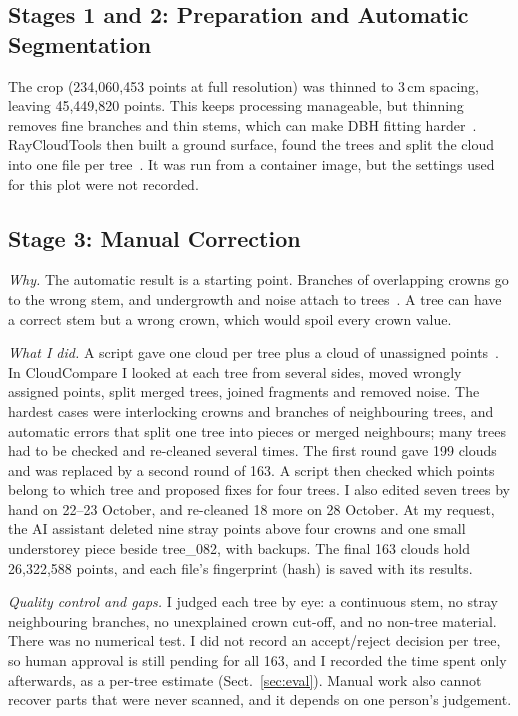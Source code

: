 \documentclass[runningheads]{llncs}
\begin{document}
\subsection{Stages 1 and 2: Preparation and Automatic Segmentation}\label{sec:prep}
The crop (234,060,453 points at full resolution) was thinned to 3\,cm spacing, leaving 45,449,820 points. This keeps processing manageable, but thinning removes fine branches and thin stems, which can make DBH fitting harder~\cite{calders2020}. RayCloudTools then built a ground surface, found the trees and split the cloud into one file per tree~\cite{pipeline}. It was run from a container image, but the settings used for this plot were not recorded.

\subsection{Stage 3: Manual Correction}\label{sec:manual}
\emph{Why.} The automatic result is a starting point. Branches of overlapping crowns go to the wrong stem, and undergrowth and noise attach to trees~\cite{calders2020,cherlet2026}. A tree can have a correct stem but a wrong crown, which would spoil every crown value.

\emph{What I did.} A script gave one cloud per tree plus a cloud of unassigned points~\cite{pipeline}. In CloudCompare I looked at each tree from several sides, moved wrongly assigned points, split merged trees, joined fragments and removed noise. The hardest cases were interlocking crowns and branches of neighbouring trees, and automatic errors that split one tree into pieces or merged neighbours; many trees had to be checked and re-cleaned several times. The first round gave 199 clouds and was replaced by a second round of 163. A script then checked which points belong to which tree and proposed fixes for four trees. I also edited seven trees by hand on 22--23 October, and re-cleaned 18 more on 28 October. At my request, the AI assistant deleted nine stray points above four crowns and one small understorey piece beside tree\_082, with backups. The final 163 clouds hold 26,322,588 points, and each file's fingerprint (hash) is saved with its results.

\emph{Quality control and gaps.} I judged each tree by eye: a continuous stem, no stray neighbouring branches, no unexplained crown cut-off, and no non-tree material. There was no numerical test. I did not record an accept/reject decision per tree, so human approval is still pending for all 163, and I recorded the time spent only afterwards, as a per-tree estimate (Sect.~\ref{sec:eval}). Manual work also cannot recover parts that were never scanned, and it depends on one person's judgement.
\end{document}
